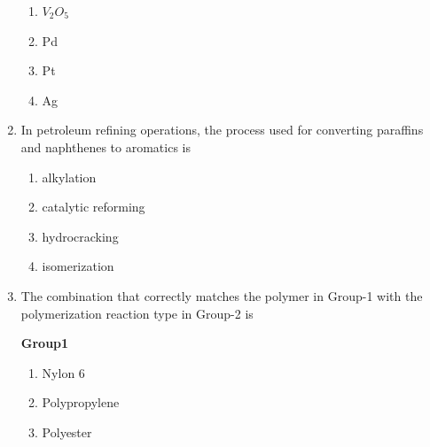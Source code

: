 \documentclass[journal]{IEEEtran}
\begin{document}
\begin{enumerate}
\begin{enumerate}
    \item $V_2 O_5$
    \item Pd
    \item Pt
    \item Ag
\end{enumerate}
\bigskip
    \item In petroleum refining operations, the process used for converting paraffins and naphthenes to aromatics is

\begin{enumerate}
    \item alkylation
    \item catalytic reforming
    \item hydrocracking
    \item isomerization
\end{enumerate}

\bigskip
    \item The combination that correctly matches the polymer in Group-1 with the polymerization reaction type in Group-2 is

\begin{multicols}{2}
    \textbf{Group1}
    \begin{enumerate}[label=(\Alph*)]
        \item Nylon 6
        \item Polypropylene
        \item Polyester
    \end{enumerate}
\columnbreak


\end{multicols}
\end{enumerate}
\end{document}
